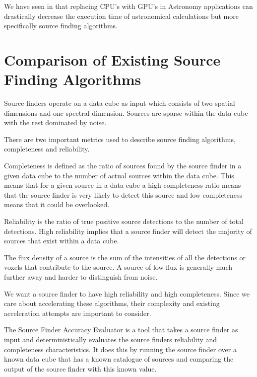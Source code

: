 \documentclass[prodmode,acmtecs]{acmsmall} \usepackage[ruled]{algorithm2e}
\begin{document}
We have seen in \cite{fluke2011astrophysical}\cite{westerlund2015performance} that replacing CPU's with GPU's in Astronomy applications
can drastically decrease the execution time of astronomical calculations but more specifically
source finding algorithms.
\cite{holwerda2010trumpeting}
\cite{whiting2012source}
\cite{floer2014source}

\section{Comparison of Existing Source Finding Algorithms}
    Source finders operate on a data cube as input which consists of two spatial dimensions
    and one spectral dimension. Sources are sparse within the data cube with the rest
    dominated by noise. \cite{walsh2012maser}

    There are two important metrics used to describe source finding algorithms, completeness and 
    reliability. \cite{popping2012comparison}

    Completeness is defined as the ratio of sources found by the source finder
    in a given data cube to the number of actual sources within the data cube. This means that
    for a given source in a data cube a high completeness ratio means that the source finder is 
    very likely to detect this source and low completeness means that it could be overlooked.

    Reliability
    is the ratio of true positive source detections to the number of total detections. High reliability
    implies that a source finder will detect the majority of sources that exist within a data cube. 

    The flux density of a source is the sum of the intensities of all the detections or voxels 
    that contribute to the source. A source of low flux is generally much further away and harder
    to distinguish from noise.

    We want a source finder to have high reliability and high completeness.
    Since we care about accelerating these algorithms, their complexity and existing 
    acceleration attempts are important to consider.

    The Source Finder Accuracy Evaluator is a tool that takes a source finder as input and deterministically
    evaluates the source finders reliability and completeness characteristics. It does this
    by running the source finder over a known data cube that has a known catalogue of sources
    and comparing the output of the source finder with this known value. \cite{westerlund2012assessing}
\end{document}
